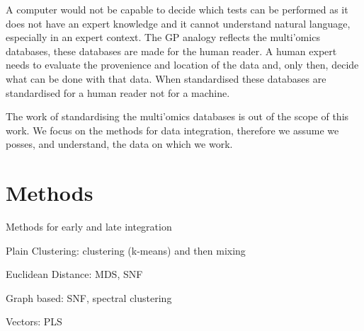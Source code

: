 \documentclass[11pt,a4paper,twoside,openright]{report}
\begin{document}
A computer would not be capable to decide which tests can be performed as it
does not have an expert knowledge and it cannot understand natural language,
especially in an expert context.  The GP analogy reflects the multi'omics
databases, these databases are made for the human reader.  A human expert needs
to evaluate the provenience and location of the data and, only then, decide
what can be done with that data.  When standardised these databases are
standardised for a human reader not for a machine.

The work of standardising the multi'omics databases is out of the  scope of
this work.  We focus on the methods for data integration, therefore we assume
we posses, and understand, the data on which we work.

\section{Methods}

Methods for early and late integration

Plain Clustering: clustering (k-means) and then mixing

Euclidean Distance: MDS, SNF

Graph based: SNF, spectral clustering

Vectors: PLS
\end{document}
